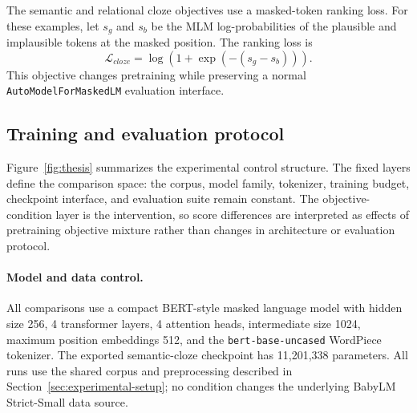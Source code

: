 \documentclass[11pt]{article}
\begin{document}
The semantic and relational cloze objectives use a masked-token ranking loss.
For these examples, let $s_g$ and $s_b$ be the MLM log-probabilities of the plausible and implausible tokens at the masked position.
The ranking loss is
\begin{equation}
  \mathcal{L}_{cloze} = \log(1 + \exp(-(s_g - s_b))).
\end{equation}
This objective changes pretraining while preserving a normal \texttt{AutoModelForMaskedLM} evaluation interface.

\subsection{Training and evaluation protocol}

Figure~\ref{fig:thesis} summarizes the experimental control structure.
The fixed layers define the comparison space: the corpus, model family, tokenizer, training budget, checkpoint interface, and evaluation suite remain constant.
The objective-condition layer is the intervention, so score differences are interpreted as effects of pretraining objective mixture rather than changes in architecture or evaluation protocol.

\paragraph{Model and data control.}
All comparisons use a compact BERT-style masked language model with hidden size 256, 4 transformer layers, 4 attention heads, intermediate size 1024, maximum position embeddings 512, and the \texttt{bert-base-uncased} WordPiece tokenizer.
The exported semantic-cloze checkpoint has 11,201,338 parameters.
All runs use the shared corpus and preprocessing described in Section~\ref{sec:experimental-setup}; no condition changes the underlying BabyLM Strict-Small data source.
\end{document}
